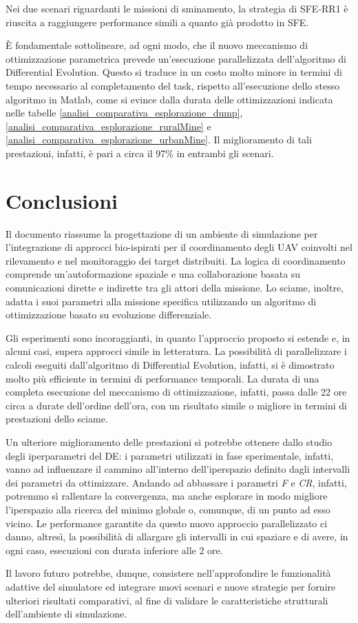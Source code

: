 Nei due scenari riguardanti le missioni di sminamento, la strategia di SFE-RR1 è riuscita a raggiungere performance simili a quanto già prodotto in SFE.

\`E fondamentale sottolineare, ad ogni modo, che il nuovo meccanismo di ottimizzazione parametrica prevede un'esecuzione parallelizzata dell'algoritmo di Differential Evolution.
Questo si traduce in un costo molto minore in termini di tempo necessario al completamento del task, rispetto all'esecuzione dello stesso algoritmo in Matlab, come si evince dalla durata delle ottimizzazioni indicata nelle tabelle \ref{analisi_comparativa_esplorazione_dump}, \ref{analisi_comparativa_esplorazione_ruralMine} e \ref{analisi_comparativa_esplorazione_urbanMine}.
Il miglioramento di tali prestazioni, infatti, è pari a circa il 97\% in entrambi gli scenari.

\newpage
\section{Conclusioni}

Il documento riassume la progettazione di un ambiente di simulazione per l’integrazione di approcci bio-ispirati per il coordinamento degli UAV coinvolti nel rilevamento e nel monitoraggio dei target distribuiti. 
La logica di coordinamento comprende un'autoformazione spaziale e una collaborazione basata su comunicazioni dirette e indirette tra gli attori della missione. 
Lo sciame, inoltre, adatta i suoi parametri alla missione specifica utilizzando un algoritmo di ottimizzazione basato su evoluzione differenziale. 

Gli esperimenti sono incoraggianti, in quanto l'approccio proposto si estende e, in alcuni casi, supera approcci simile in letteratura. 
La possibilità di parallelizzare i calcoli eseguiti dall'algoritmo di Differential Evolution, infatti, si è dimostrato molto più efficiente in termini di performance temporali.
La durata di una completa esecuzione del meccanismo di ottimizzazione, infatti, passa dalle 22 ore circa a durate dell'ordine dell'ora, con un risultato simile o migliore in termini di prestazioni dello sciame.

Un ulteriore miglioramento delle prestazioni si potrebbe ottenere dallo studio degli iperparametri del DE: i parametri utilizzati in fase sperimentale, infatti, vanno ad influenzare il cammino all'interno dell'iperspazio definito dagli intervalli dei parametri da ottimizzare.
Andando ad abbassare i parametri \textit{F} e \textit{CR}, infatti, potremmo sì rallentare la convergenza, ma anche esplorare in modo migliore l'iperspazio alla ricerca del minimo globale o, comunque, di un punto ad esso vicino.
Le performance garantite da questo nuovo approccio parallelizzato ci danno, altresì, la possibilità di allargare gli intervalli in cui spaziare e di avere, in ogni caso, esecuzioni con durata inferiore alle 2 ore. 

Il lavoro futuro potrebbe, dunque, consistere nell’approfondire le funzionalità adattive del simulatore ed integrare nuovi scenari e nuove strategie per fornire ulteriori risultati comparativi, al fine di validare le caratteristiche strutturali dell’ambiente di simulazione.